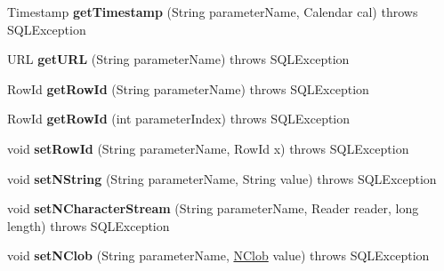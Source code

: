 \begin{DoxyCompactItemize}
Timestamp {\bfseries get\+Timestamp} (String parameter\+Name, Calendar cal)  throws S\+Q\+L\+Exception 
\item 
\mbox{\label{classcom_1_1mysql_1_1cj_1_1jdbc_1_1_callable_statement_wrapper_a61e5e0b9815931dbf92c57ad246fcdcf}} 
U\+RL {\bfseries get\+U\+RL} (String parameter\+Name)  throws S\+Q\+L\+Exception 
\item 
\mbox{\label{classcom_1_1mysql_1_1cj_1_1jdbc_1_1_callable_statement_wrapper_ab13ba2b030b4633c90f4ff764d466c7d}} 
Row\+Id {\bfseries get\+Row\+Id} (String parameter\+Name)  throws S\+Q\+L\+Exception 
\item 
\mbox{\label{classcom_1_1mysql_1_1cj_1_1jdbc_1_1_callable_statement_wrapper_abb6bffb51f12728815f6a5e35ed0038b}} 
Row\+Id {\bfseries get\+Row\+Id} (int parameter\+Index)  throws S\+Q\+L\+Exception 
\item 
\mbox{\label{classcom_1_1mysql_1_1cj_1_1jdbc_1_1_callable_statement_wrapper_a06fb28a492e2d132899b38498db870ee}} 
void {\bfseries set\+Row\+Id} (String parameter\+Name, Row\+Id x)  throws S\+Q\+L\+Exception 
\item 
\mbox{\label{classcom_1_1mysql_1_1cj_1_1jdbc_1_1_callable_statement_wrapper_a541d6ad71c70ca117fad5b601fbc332b}} 
void {\bfseries set\+N\+String} (String parameter\+Name, String value)  throws S\+Q\+L\+Exception 
\item 
\mbox{\label{classcom_1_1mysql_1_1cj_1_1jdbc_1_1_callable_statement_wrapper_a43950dd560f5be72b6c7136db24791d2}} 
void {\bfseries set\+N\+Character\+Stream} (String parameter\+Name, Reader reader, long length)  throws S\+Q\+L\+Exception 
\item 
\mbox{\label{classcom_1_1mysql_1_1cj_1_1jdbc_1_1_callable_statement_wrapper_a760d8d5eeb6beda2136975b75a59ba3c}} 
void {\bfseries set\+N\+Clob} (String parameter\+Name, \mbox{\hyperlink{classcom_1_1mysql_1_1cj_1_1jdbc_1_1_n_clob}{N\+Clob}} value)  throws S\+Q\+L\+Exception 

\end{DoxyCompactItemize}
